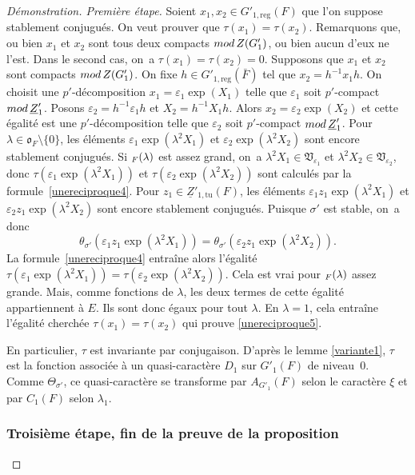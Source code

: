 \documentclass[11pt]{article}
\numberwithin{equation}{section}\providecommand{\og}{«\,}\providecommand{\fg}{\,»}
\newcommand{\NoChangel}[1]{%
\expandafter\let\csname old\string#1\endcsname=#1
\let#1=\relax
\newcommand{#1}{\mathcode`l="716C\csname old\string#1\endcsname\mathcode`l="7160 }%
}
\let\epsilon\varepsilon
\newcommand{\rmod}{\textup{mod}\,}
\newcommand{\fro}{\mathfrak{o}}
\newcommand{\frV}{\mathfrak{V}}
\newcommand{\reg}{\mathrm{reg}}
\newcommand{\tu}{\mathrm{tu}}
\DeclareMathOperator{\val}{val} \NoChangel{\val}
\theoremstyle{plain}
\theoremstyle{definition}
\renewcommand{\proofname}{Démonstration}
\begin{document}
\begin{proof}[\proofname. Première étape]
Soient $x_{1},x_{2}\in G'_{1,\reg}(F)$ que l'on suppose stablement conjugués. On veut prouver que $\tau(x_{1})=\tau(x_{2})$. Remarquons que, ou bien $x_{1}$ et $x_{2}$ sont tous deux compacts $\rmod Z(G'_{1})$, ou bien aucun d'eux ne l'est. Dans le second cas, on~a \hbox{$\tau(x_{1})=\tau(x_{2})=0$}. Supposons que $x_{1}$ et $x_{2}$ sont compacts $\rmod Z(G'_{1})$. On fixe $h\in G'_{1,\reg}(\bar{F})$ tel que $x_{2}=h^{-1}x_{1}h$. On choisit une $p'$-décomposition $x_{1}=\epsilon_{1}\exp(X_{1})$ telle que $\epsilon_{1}$ soit $p'$-compact $\rmod \underline{Z}'_{1}$. Posons $\epsilon_{2}=h^{-1}\epsilon_{1}h$ et $X_{2}=h^{-1}X_{1}h$. Alors $x_{2}=\epsilon_{2}\exp(X_{2})$ et cette égalité est une $p'$-décomposition telle que $\epsilon_{2}$ soit $p'$-compact $\rmod \underline{Z}'_{1}$. Pour \hbox{$\lambda\in \fro_{F}\setminus\{0\}$}, les éléments $\epsilon_{1}\exp(\lambda^2X_{1})$ et $\epsilon_{2}\exp(\lambda^2X_{2})$ sont encore stablement conjugués. Si $\val_{F}(\lambda)$ est assez grand, on~a $\lambda^2X_{1}\in \frV_{\epsilon_{1}}$ et $\lambda^2X_{2}\in \frV_{\epsilon_{2}}$, donc $\tau(\epsilon_{1}\exp(\lambda^2X_{1}))$ et $\tau(\epsilon_{2}\exp(\lambda^2X_{2}))$ sont calculés par la formule~\eqref{unereciproque4}. Pour $z_{1}\in \underline{Z}'_{1,\tu}(F)$, les éléments $\epsilon_{1}z_{1}\exp(\lambda^2X_{1})$ et $\epsilon_{2}z_{1}\exp(\lambda^2X_{2})$ sont encore stablement conjugués. Puisque $\sigma'$ est stable, on~a donc
\[
\theta_{\sigma'}(\epsilon_{1}z_{1}\exp(\lambda^2X_{1}))=\theta_{\sigma'}(\epsilon_{2}z_{1}\exp(\lambda^2X_{2})).
\]
La formule~\eqref{unereciproque4} entraîne alors l'égalité $\tau(\epsilon_{1}\exp(\lambda^2X_{1}))=\tau(\epsilon_{2}\exp(\lambda^2X_{2}))$. Cela est vrai pour $\val_{F}(\lambda)$ assez grande. Mais, comme fonctions de $\lambda$, les deux termes de cette égalité appartiennent à $E$. Ils sont donc égaux pour tout $\lambda$. En $\lambda=1$, cela entraîne l'égalité cherchée $\tau(x_{1})=\tau(x_{2})$ qui prouve \eqref{unereciproque5}.

En particulier, $\tau$
est invariante par conjugaison. D'après le lemme \ref{variante1}, $\tau$ est la fonction associée à un quasi-caractère $D_{1}$ sur $G'_{1}(F)$ de niveau~$0$. Comme $\Theta_{\sigma'}$, ce quasi-caractère se transforme par $A_{G'_{1}}(F)$ selon le caractère $\xi$ et par $C_{1}(F)$ selon $\lambda_{1}$.

\subsubsection*{Troisième étape, fin de la preuve de la proposition}


\end{proof}
\end{document}
